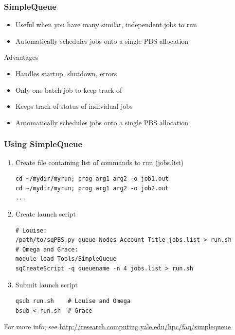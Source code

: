 \documentclass[10pt]{beamer}
\begin{document}
\begin{frame}[fragile]
\frametitle{SimpleQueue}

\begin{itemize}
\item Useful when you have many similar, independent jobs to run
\item Automatically schedules jobs onto a single PBS allocation
\end{itemize}

Advantages

\begin{itemize}
\item Handles startup, shutdown, errors
\item Only one batch job to keep track of
\item Keeps track of status of individual jobs
\item Automatically schedules jobs onto a single PBS allocation
\end{itemize}

\end{frame}


\begin{frame}[fragile]
\frametitle{Using SimpleQueue}

\begin{enumerate}
\item Create file containing list of commands to run (jobs.list)
\begin{verbatim}
cd ~/mydir/myrun; prog arg1 arg2 -o job1.out  
cd ~/mydir/myrun; prog arg1 arg2 -o job2.out  
...
\end{verbatim}
\item Create launch script
\begin{verbatim}
# Louise:
/path/to/sqPBS.py queue Nodes Account Title jobs.list > run.sh
# Omega and Grace:
module load Tools/SimpleQueue
sqCreateScript -q queuename -n 4 jobs.list > run.sh
\end{verbatim}

\item Submit launch script
\begin{verbatim}
qsub run.sh    # Louise and Omega
bsub < run.sh  # Grace
\end{verbatim}
\end{enumerate}

For more info, see \url{http://research.computing.yale.edu/hpc/faq/simplequeue}

\end{frame}
\end{document}
